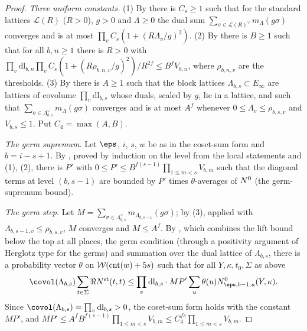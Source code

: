 \begin{proof}
\emph{Three uniform constants.} (1) By  there is $C_s\ge1$ such that for
the standard lattices $\mathcal L(R)$ ($R>0$), $g>0$ and $\Lambda\ge0$ the dual sum $\sum_{\sigma\in\mathcal L(R)^\vee}
m_\Lambda(g\sigma)$ converges and is at most $\prod_vC_s(1+(R\Lambda_v/g)^2)$. (2) By
 there is $B\ge1$ such that for all $b,n\ge1$ there is $R>0$ with
$\prod_v\mathrm{dl}_{b,n}\prod_vC_s(1+(R\rho_{b,n,v}/g)^2)/R^{2f}\le B^fV_{b,n}$, where $\rho_{b,n,v}$ are the thresholds.
(3) By  there is $A\ge1$ such that the block lattices
$\Lambda_{b,s}\subset E_\infty$ are lattices of covolume $\prod_v\mathrm{dl}_{b,s}$ whose duals, scaled by $g$, lie in a lattice,
and such that $\sum_{\sigma\in\Lambda_{b,s}^\vee}m_\Lambda(g\sigma)$ converges and is at most $A^f$ whenever $0\le\Lambda_v\le
\rho_{b,s,v}$ and $V_{b,s}\le1$. Put $C_4=\max(A,B)$.

\emph{The germ supremum.} Let $\eps$, $i$, $s$, $w$ be as in the coset-sum form and $b=i-s+1$. By
, proved by induction on the level from the local statements and (1),
(2), there is $P'$ with $0\le P'\le B^{f(s-1)}\prod_{1\le m<s}V_{b,m}$ such that the diagonal terms at
level $(b,s-1)$ are bounded by $P'$ times $\theta$-averages of $N^{0}$ (the germ-supremum bound).

\emph{The germ step.} Let $M=\sum_{\sigma\in\Lambda_{b,s}^\vee}m_{\Lambda_{b,s-1}}(g\sigma)$; by (3), applied with
$\Lambda_{b,s-1,v}\le\rho_{b,s,v}$, $M$ converges and $M\le A^f$. By
, which combines the lift bound below the top at all places, the germ
condition (through a positivity argument of Herglotz type for the germs) and summation over the dual lattice of
$\Lambda_{b,s}$, there is a probability vector $\theta$ on
$\mathcal{W}(\operatorname{cnt}(w)+5s)$ such that for all $Y,\kappa,t_0,\Sigma$ as above
\[
\covol(\Lambda_{b,s})\sum_{t\in\Sigma}\Re\thmScarrierNst(t,t)\le\prod_v\mathrm{dl}_{b,s}\cdot MP'\sum_u\theta(u)
\thmScarrierNz_{\eps,b-1,u}(Y,\kappa).
\]
Since $\covol(\Lambda_{b,s})=\prod_v\mathrm{dl}_{b,s}>0$, the coset-sum form holds with the constant $MP'$, and
$MP'\le A^fB^{f(s-1)}\prod_{1\le m<s}V_{b,m}\le C_4^{fs}\prod_{1\le m<s}V_{b,m}$.
\end{proof}


